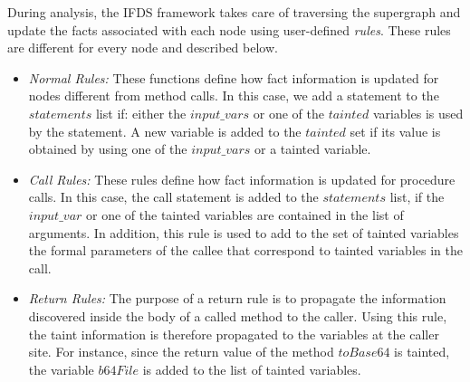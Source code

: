 
During analysis, the IFDS framework takes care of traversing the supergraph and update the facts associated with each node using user-defined \emph{rules}. These rules are different for every node and described below.
\begin{itemize}
 \item \textit{Normal Rules:} These functions define how fact information is updated for nodes different from method calls. In this case, we add a statement to the $statements$ list if: either the $input\_vars$ or one of the $tainted$ variables is used by the statement. A new variable is added to the $tainted$ set if its value is obtained by using one of the $input\_vars$ or a tainted variable. 
 \item \textit{Call Rules:} These rules define how fact information is updated for procedure calls. In this case, the call statement is added to the $statements$ list, if the $input\_var$ or one of the tainted variables are contained in the list of arguments. In addition, this rule is used to add to the set of tainted variables the formal parameters of the callee that correspond to tainted variables in the call.
 \item \textit{Return Rules:} The purpose of a return rule is to propagate the information discovered inside the body of a called method to the caller. Using this rule, the taint information is therefore propagated to the variables at the caller site. For instance, since the return value of the method $toBase64$ is tainted, the variable $b64File$ is added to the list of tainted variables.
\end{itemize}


